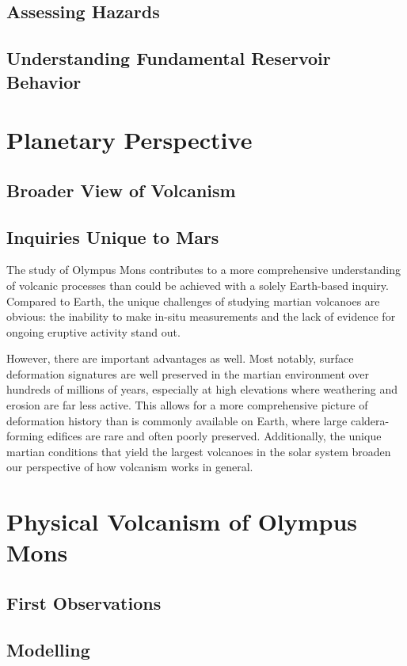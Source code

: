 \subsection{Assessing Hazards}
\subsection{Understanding Fundamental Reservoir Behavior}

\section{Planetary Perspective}

\subsection{Broader View of Volcanism}
\subsection{Inquiries Unique to Mars}
The study of Olympus Mons contributes to a more comprehensive understanding of volcanic processes than could be achieved with a solely Earth-based inquiry. Compared to Earth, the unique challenges of studying martian volcanoes are obvious: the inability to make in-situ measurements and the lack of evidence for ongoing eruptive activity stand out. 

However, there are important advantages as well. Most notably, surface deformation signatures are well preserved in the martian environment over hundreds of millions of years, especially at high elevations where weathering and erosion are far less active. This allows for a more comprehensive picture of deformation history than is commonly available on Earth, where large caldera-forming edifices are rare and often poorly preserved. Additionally, the unique martian conditions that yield the largest volcanoes in the solar system broaden our perspective of how volcanism works in general.

\section{Physical Volcanism of Olympus Mons}
\subsection{First Observations}
\subsection{Modelling}
